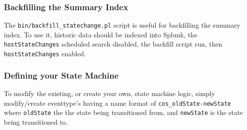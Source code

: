 \subsubsection{Backfilling the Summary Index}
The {\tt bin/backfill\_statechange.pl} script is useful for backfilling the summary index.
To use it, historic data should be indexed into Splunk, the {\tt hostStateChanges} scheduled
search disabled, the backfill script run, then {\tt hostStateChanges} enabled.
\subsubsection{Defining your State Machine}
To modify the existing, or create your own, state machine logic, simply modify/create
eventtype's having a name format of {\tt cos\_oldState-newState} where {\tt oldState}
the the state being transitioned from, and {\tt newState} is the state being transitioned
to.
